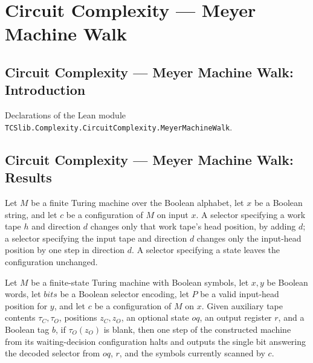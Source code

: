 \section{Circuit Complexity --- Meyer Machine Walk}
\subsection*{Circuit Complexity --- Meyer Machine Walk: Introduction}

Declarations of the Lean module \texttt{TCSlib.Complexity.CircuitComplexity.MeyerMachineWalk}.

\subsection*{Circuit Complexity --- Meyer Machine Walk: Results}

\begin{definition}
\label{Complexity.Meyer.wstep}
\leanok
{}
Let $M$ be a finite Turing machine over the Boolean alphabet, let $x$ be a Boolean
string, and let $c$ be a configuration of $M$ on input $x$. A selector specifying a work
tape $h$ and direction $d$ changes only that work tape's head position, by adding $d$; a
selector specifying the input tape and direction $d$ changes only the input-head
position by one step in direction $d$. A selector specifying a state leaves the
configuration unchanged.
\end{definition}

\begin{theorem}
\label{Complexity.Meyer.wdec_emit}
\leanok
{}
Let $M$ be a finite-state Turing machine with Boolean symbols, let $x,y$ be Boolean
words, let $bits$ be a Boolean selector encoding, let $P$ be a valid input-head position
for $y$, and let $c$ be a configuration of $M$ on $x$. Given auxiliary tape contents
$\tau_C,\tau_O$, positions $z_C,z_O$, an optional state $oq$, an output register $r$,
and a Boolean tag $b$, if $\tau_O(z_O)$ is blank, then one step of the constructed
machine from its waiting-decision configuration halts and outputs the single bit
answering the decoded selector from $oq$, $r$, and the symbols currently scanned by $c$.
\end{theorem}

